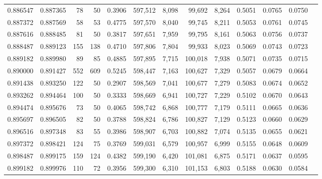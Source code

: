 \begin{tabular}{rrrrrrrrrrrrr}
0.886547 & 0.887365 &    78 &  50 &                                     0.3906 & 597,512 &   8,098 &  99,692 &   8,264 & 0.5051 & 0.0765 & 0.0750 \\
0.887372 & 0.887569 &    58 &  53 &                                     0.4775 & 597,570 &   8,040 &  99,745 &   8,211 & 0.5053 & 0.0761 & 0.0745 \\
0.887616 & 0.888485 &    81 &  50 &                                     0.3817 & 597,651 &   7,959 &  99,795 &   8,161 & 0.5063 & 0.0756 & 0.0737 \\
0.888487 & 0.889123 &   155 & 138 &                                     0.4710 & 597,806 &   7,804 &  99,933 &   8,023 & 0.5069 & 0.0743 & 0.0723 \\
0.889182 & 0.889980 &    89 &  85 &                                     0.4885 & 597,895 &   7,715 & 100,018 &   7,938 & 0.5071 & 0.0735 & 0.0715 \\
0.890000 & 0.891427 &   552 & 609 &                                     0.5245 & 598,447 &   7,163 & 100,627 &   7,329 & 0.5057 & 0.0679 & 0.0664 \\
0.891438 & 0.893250 &   122 &  50 &                                     0.2907 & 598,569 &   7,041 & 100,677 &   7,279 & 0.5083 & 0.0674 & 0.0652 \\
0.893262 & 0.894464 &   100 &  50 &                                     0.3333 & 598,669 &   6,941 & 100,727 &   7,229 & 0.5102 & 0.0670 & 0.0643 \\
0.894474 & 0.895676 &    73 &  50 &                                     0.4065 & 598,742 &   6,868 & 100,777 &   7,179 & 0.5111 & 0.0665 & 0.0636 \\
0.895697 & 0.896505 &    82 &  50 &                                     0.3788 & 598,824 &   6,786 & 100,827 &   7,129 & 0.5123 & 0.0660 & 0.0629 \\
0.896516 & 0.897348 &    83 &  55 &                                     0.3986 & 598,907 &   6,703 & 100,882 &   7,074 & 0.5135 & 0.0655 & 0.0621 \\
0.897372 & 0.898421 &   124 &  75 &                                     0.3769 & 599,031 &   6,579 & 100,957 &   6,999 & 0.5155 & 0.0648 & 0.0609 \\
0.898487 & 0.899175 &   159 & 124 &                                     0.4382 & 599,190 &   6,420 & 101,081 &   6,875 & 0.5171 & 0.0637 & 0.0595 \\
0.899182 & 0.899976 &   110 &  72 &                                     0.3956 & 599,300 &   6,310 & 101,153 &   6,803 & 0.5188 & 0.0630 & 0.0584 \\

\end{tabular}
